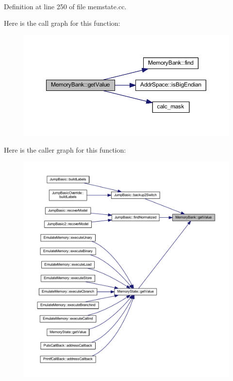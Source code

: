 Definition at line 250 of file memstate.\+cc.

Here is the call graph for this function\+:
\nopagebreak
\begin{figure}[H]
\begin{center}
\leavevmode
\includegraphics[width=350pt]{class_memory_bank_a8149ad04fb877f78b56abd1b67962b31_cgraph}
\end{center}
\end{figure}
Here is the caller graph for this function\+:
\nopagebreak
\begin{figure}[H]
\begin{center}
\leavevmode
\includegraphics[width=350pt]{class_memory_bank_a8149ad04fb877f78b56abd1b67962b31_icgraph}
\end{center}
\end{figure}
\mbox{\label{class_memory_bank_a996d7c04af8f8bf02ce7abb91d693dc5}} 
